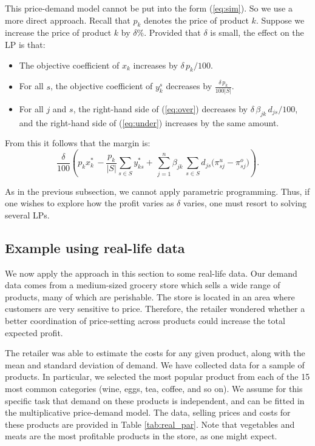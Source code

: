 \documentclass[a4paper,11pt]{article}
\begin{document}
This price-demand model cannot be put into the form (\ref{eq:sim}). So we use a more direct approach. Recall that $p_k$ denotes the price of product $k$. Suppose we increase the price of product $k$ by $\delta \%$. Provided that $\delta$ is small, the effect on the LP is that:
\begin{itemize}
\item The objective coefficient of $x_k$ increases by $\delta \, p_k / 100$.
\item For all $s$, the objective coefficient of $y_k^s$ decreases by $\frac{\delta \, p_k}{100 |S|}$.
\item For all $j$ and $s$, the right-hand side of (\ref{eq:over}) decreases by $\delta \, \beta_{jk} \, d_{js}/100$, and the right-hand side of (\ref{eq:under}) increases by the same amount.
\end{itemize}
From this it follows that the margin is:
\[
\frac{\delta}{100} \left(
p_k x^*_k \, - \frac{p_k}{|S|} \sum_{s \in S} y^*_{ks}+ \,
\sum_{j=1}^n \beta_{jk} \, \sum_{s \in S} d_{js} \big( \pi_{sj}^u - \pi_{sj}^o \big)
\right).
\]

As in the previous subsection, we cannot apply parametric programming. Thus, if one wishes to explore how the profit varies as $\delta$ varies, one must resort to solving several LPs.

\subsection{Example using real-life data}
\label{sub:price3}

We now apply the approach in this section to some real-life data. Our demand data comes from a medium-sized grocery store which sells a wide range of products, many of which are perishable. The store is located in an area where customers are very sensitive to price. Therefore, the retailer wondered whether a better coordination of price-setting across products could increase the total expected profit.

The retailer was able to estimate the costs for any given product, along with the mean and standard deviation of demand. We have collected data for a sample of products. In particular, we selected the most popular product from each of the 15 most common categories (wine, eggs, tea, coffee, and so on). We assume for this specific task that demand on these products is independent, and can be fitted in the multiplicative price-demand model. The data, selling prices and costs for these products are provided in Table \ref{tab:real_par}. Note that vegetables and meats are the most profitable products in the store, as one might expect.
\end{document}
